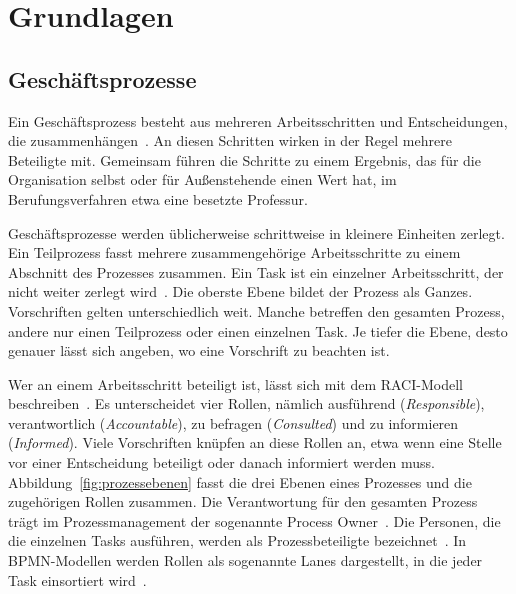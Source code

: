 \section{Grundlagen}
\subsection{Geschäftsprozesse}\label{sec:geschaeftsprozesse}
Ein Geschäftsprozess besteht aus mehreren Arbeitsschritten und Entscheidungen, die zusammenhängen~\cite{dumas2018}.
An diesen Schritten wirken in der Regel mehrere Beteiligte mit.
Gemeinsam führen die Schritte zu einem Ergebnis, das für die Organisation selbst oder für Außenstehende einen Wert hat, im Berufungsverfahren etwa eine besetzte Professur.

Geschäftsprozesse werden üblicherweise schrittweise in kleinere Einheiten zerlegt.
Ein Teilprozess fasst mehrere zusammengehörige Arbeitsschritte zu einem Abschnitt des Prozesses zusammen.
Ein Task ist ein einzelner Arbeitsschritt, der nicht weiter zerlegt wird~\cite{bpmn2014}.
Die oberste Ebene bildet der Prozess als Ganzes.
Vorschriften gelten unterschiedlich weit.
Manche betreffen den gesamten Prozess, andere nur einen Teilprozess oder einen einzelnen Task.
Je tiefer die Ebene, desto genauer lässt sich angeben, wo eine Vorschrift zu beachten ist.

Wer an einem Arbeitsschritt beteiligt ist, lässt sich mit dem RACI-Modell beschreiben~\cite{pmbok2013}.
Es unterscheidet vier Rollen, nämlich ausführend (\emph{Responsible}), verantwortlich (\emph{Accountable}), zu befragen (\emph{Consulted}) und zu informieren (\emph{Informed}).
Viele Vorschriften knüpfen an diese Rollen an, etwa wenn eine Stelle vor einer Entscheidung beteiligt oder danach informiert werden muss.
Abbildung~\ref{fig:prozessebenen} fasst die drei Ebenen eines Prozesses und die zugehörigen Rollen zusammen.
Die Verantwortung für den gesamten Prozess trägt im Prozessmanagement der sogenannte Process Owner~\cite{dumas2018}.
Die Personen, die die einzelnen Tasks ausführen, werden als Prozessbeteiligte bezeichnet~\cite{dumas2018}.
In BPMN-Modellen werden Rollen als sogenannte Lanes dargestellt, in die jeder Task einsortiert wird~\cite{bpmn2014}.

